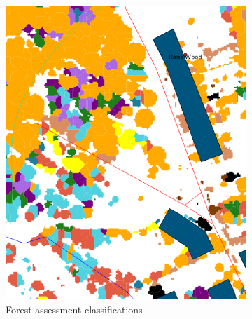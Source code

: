 \documentclass{subfiles}
\begin{document}
\begin{figure} [h!]
\begin{subfigure}[t]{.5\textwidth}
	   		\includegraphics[width=.9\textwidth]{img/NewForest/Area2Classifications}
	   		\caption{Forest assessment classifications} 
	   		\label{fig:Area2Classifications}
	   	\end{subfigure}
	   	\begin{subfigure}[t]{.5\textwidth}
	   		

\end{subfigure}
\end{figure}
\end{document}
